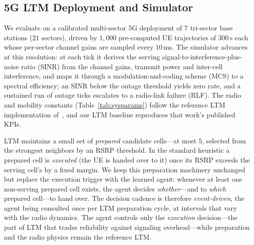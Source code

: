 \documentclass[conference]{IEEEtran}
\begin{document}
\subsection{5G LTM Deployment and Simulator}
We evaluate on a calibrated multi-sector 5G deployment of $7$ tri-sector base
stations ($21$ sectors), driven by $1{,}000$ pre-computed UE trajectories of
$300$\,s each whose per-sector channel gains are sampled every $10$\,ms. The
simulator advances at this resolution: at each tick it derives the serving
signal-to-interference-plus-noise ratio (SINR) from the channel gains, transmit
power and inter-cell interference, and maps it through a modulation-and-coding
scheme (MCS) to a spectral efficiency; an SINR below the outage threshold yields
zero rate, and a sustained run of outage ticks escalates to a radio-link failure
(RLF). The radio and mobility constants (Table~\ref{tab:sysparams}) follow the
reference LTM implementation of~\cite{cmab_ho}, and our LTM baseline reproduces
that work's published KPIs.

LTM maintains a small set of \emph{prepared} candidate cells---at most $5$,
selected from the strongest neighbors by an RSRP threshold. In
the standard heuristic a prepared cell is \emph{executed} (the UE is handed over
to it) once its RSRP exceeds the serving cell's by a fixed margin. We keep this
preparation machinery unchanged but replace the execution trigger with the
learned agent: whenever at least one non-serving prepared cell exists, the agent
decides \emph{whether}---and to \emph{which} prepared cell---to hand over. The
decision cadence is therefore \emph{event-driven}, the agent being consulted
once per LTM preparation cycle, at intervals that vary with the radio dynamics.
The agent controls only the \emph{execution} decision---the part of LTM
that trades reliability against signaling overhead---while preparation and the
radio physics remain the reference LTM.
\end{document}
